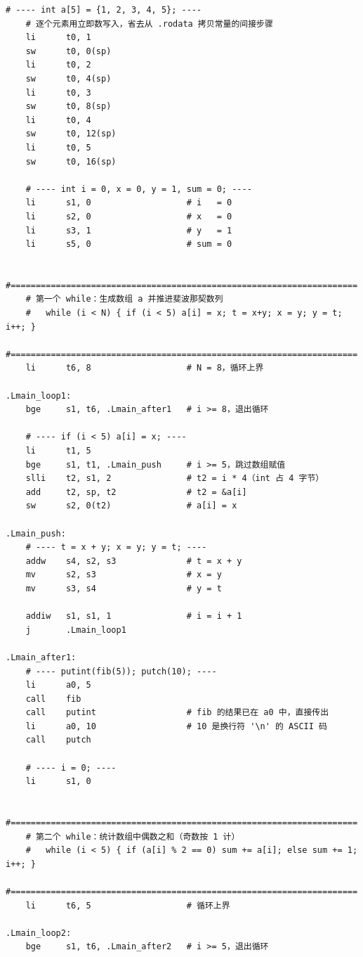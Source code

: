 \documentclass[UTF8,a4paper,10pt]{ctexart}
\begin{document}
\begin{lstlisting}[language=riscv]
    # ---- int a[5] = {1, 2, 3, 4, 5}; ----
    # 逐个元素用立即数写入，省去从 .rodata 拷贝常量的间接步骤
    li      t0, 1
    sw      t0, 0(sp)
    li      t0, 2
    sw      t0, 4(sp)
    li      t0, 3
    sw      t0, 8(sp)
    li      t0, 4
    sw      t0, 12(sp)
    li      t0, 5
    sw      t0, 16(sp)

    # ---- int i = 0, x = 0, y = 1, sum = 0; ----
    li      s1, 0                   # i   = 0
    li      s2, 0                   # x   = 0
    li      s3, 1                   # y   = 1
    li      s5, 0                   # sum = 0

    #=====================================================================
    # 第一个 while：生成数组 a 并推进斐波那契数列
    #   while (i < N) { if (i < 5) a[i] = x; t = x+y; x = y; y = t; i++; }
    #=====================================================================
    li      t6, 8                   # N = 8，循环上界

.Lmain_loop1:
    bge     s1, t6, .Lmain_after1   # i >= 8，退出循环

    # ---- if (i < 5) a[i] = x; ----
    li      t1, 5
    bge     s1, t1, .Lmain_push     # i >= 5，跳过数组赋值
    slli    t2, s1, 2               # t2 = i * 4（int 占 4 字节）
    add     t2, sp, t2              # t2 = &a[i]
    sw      s2, 0(t2)               # a[i] = x

.Lmain_push:
    # ---- t = x + y; x = y; y = t; ----
    addw    s4, s2, s3              # t = x + y
    mv      s2, s3                  # x = y
    mv      s3, s4                  # y = t

    addiw   s1, s1, 1               # i = i + 1
    j       .Lmain_loop1

.Lmain_after1:
    # ---- putint(fib(5)); putch(10); ----
    li      a0, 5
    call    fib
    call    putint                  # fib 的结果已在 a0 中，直接传出
    li      a0, 10                  # 10 是换行符 '\n' 的 ASCII 码
    call    putch

    # ---- i = 0; ----
    li      s1, 0

    #=====================================================================
    # 第二个 while：统计数组中偶数之和（奇数按 1 计）
    #   while (i < 5) { if (a[i] % 2 == 0) sum += a[i]; else sum += 1; i++; }
    #=====================================================================
    li      t6, 5                   # 循环上界

.Lmain_loop2:
    bge     s1, t6, .Lmain_after2   # i >= 5，退出循环


\end{lstlisting}
\end{document}
